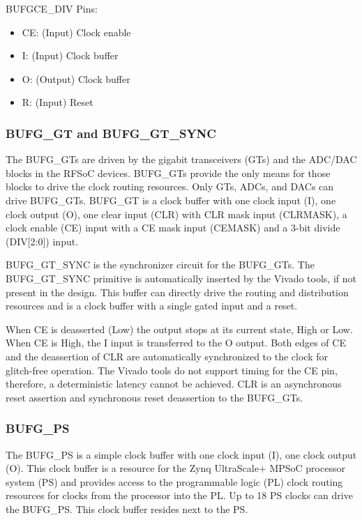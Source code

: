 \documentclass[12pt, a4paper]{report}
\begin{document}
    BUFGCE\_DIV Pins:
    \begin{itemize}
        \item CE: (Input) Clock enable
        \item I: (Input) Clock buffer
        \item O: (Output) Clock buffer
        \item R: (Input) Reset
    \end{itemize}

    \subsubsection{BUFG\_GT and BUFG\_GT\_SYNC}
    The BUFG\_GTs are driven by the gigabit transceivers (GTs) and the ADC/DAC blocks in the RFSoC devices. BUFG\_GTs provide the only means for those blocks to drive the clock routing resources. Only GTs, ADCs, and DACs can drive BUFG\_GTs. BUFG\_GT is a clock
    buffer with one clock input (I), one clock output (O), one clear input (CLR) with CLR mask input (CLRMASK), a clock enable (CE) input with a CE mask input (CEMASK) and a 3-bit divide (DIV[2:0]) input. 
    
    BUFG\_GT\_SYNC is the synchronizer circuit for the BUFG\_GTs. The BUFG\_GT\_SYNC primitive is automatically inserted by the Vivado
    tools, if not present in the design. This buffer can directly drive the routing and distribution resources and is a clock buffer with a single gated input and a reset.     
    
    When CE is deasserted (Low) the output stops at its current state, High or Low. When CE is High, the I input is transferred to the O output. Both edges of CE and the deassertion of CLR are automatically
    synchronized to the clock for glitch-free operation. The Vivado tools do not support timing for the CE pin, therefore, a deterministic latency cannot be achieved. CLR is an asynchronous reset assertion and synchronous reset deassertion to the BUFG\_GTs. 

    \subsubsection{BUFG\_PS}
    The BUFG\_PS is a simple clock buffer with one clock input (I), one clock output (O). This clock buffer is a resource for the Zynq UltraScale+ MPSoC processor system (PS) and provides access to the programmable logic (PL) clock routing resources for clocks from the
    processor into the PL. Up to 18 PS clocks can drive the BUFG\_PS. This clock buffer resides next to the PS.
\end{document}
